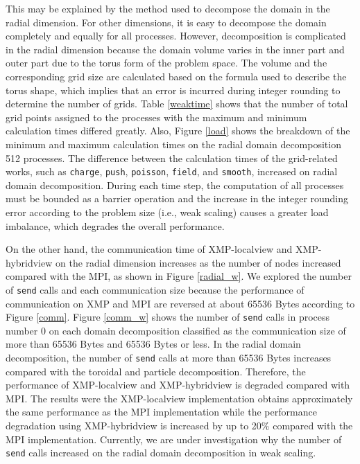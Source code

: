 This may be explained by the method used to decompose the domain in the radial dimension. For other dimensions, it is easy to decompose the domain completely and equally for all processes. However, decomposition is complicated in the radial dimension because the domain volume varies in the inner part and outer part due to the torus form of the problem space. The volume and the corresponding grid size are calculated based on the formula used to describe the torus shape, which implies that an error is incurred during integer rounding to determine the number of grids. Table \ref{weaktime} shows that the number of total grid points assigned to the processes with the maximum and minimum calculation times differed greatly. Also, Figure \ref{load} shows the breakdown of the minimum and maximum calculation times on the radial domain decomposition 512 processes. The difference between the calculation times of the grid-related works, such as {\tt charge}, {\tt push}, {\tt poisson}, {\tt field}, and {\tt smooth}, increased on radial domain decomposition. During each time step, the computation of all processes must be bounded as a barrier operation and the increase in the integer rounding error according to the problem size (i.e., weak scaling) causes a greater load imbalance, which degrades the overall performance. 

On the other hand, the communication time of XMP-localview and XMP-hybridview on the radial dimension increases as the number of nodes increased compared with the MPI, as shown in Figure \ref{radial_w}. We explored the number of {\tt send} calls and each communication size because the performance of communication on XMP and MPI are reversed at about 65536 Bytes according to Figure \ref{comm}. Figure \ref{comm_w} shows the number of {\tt send} calls in process number 0 on each domain decomposition classified as the communication size of more than 65536 Bytes and 65536 Bytes or less. In the radial domain decomposition, the number of {\tt send} calls at more than 65536 Bytes increases compared with the toroidal and particle decomposition. Therefore, the performance of XMP-localview and XMP-hybridview is degraded compared with MPI. The results were the XMP-localview implementation obtains approximately the same performance as the MPI implementation while the performance degradation using XMP-hybridview is increased by up to 20\% compared with the MPI implementation. Currently, we are under investigation why the number of {\tt send} calls increased on the radial domain decomposition in weak scaling.

